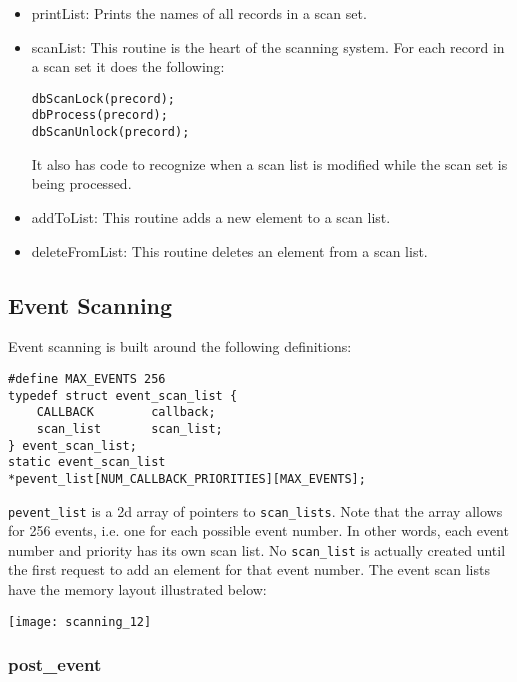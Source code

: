 \begin{itemize}
\item printList: Prints the names of all records in a scan set.

\item scanList: This routine is the heart of the scanning system.
For each record in a scan set it does the following:

\begin{verbatim}
dbScanLock(precord);
dbProcess(precord);
dbScanUnlock(precord);
\end{verbatim}

It also has code to recognize when a scan list is modified while the scan set is being processed.

\item addToList: This routine adds a new element to a scan list.

\item deleteFromList: This routine deletes an element from a scan list.

\end{itemize}

\subsection{Event Scanning}

Event scanning is built around the following definitions:

\begin{verbatim}
#define MAX_EVENTS 256
typedef struct event_scan_list {
    CALLBACK        callback;
    scan_list       scan_list;
} event_scan_list;
static event_scan_list
*pevent_list[NUM_CALLBACK_PRIORITIES][MAX_EVENTS];
\end{verbatim}

\verb|pevent_list| is a 2d array of pointers to \verb|scan_lists|.
Note that the array allows for 256 events, i.e. one for each possible event number.
In other words, each event number and priority has its own scan list.
No \verb|scan_list| is actually created until the first request to add an element for that event number.
The event scan lists have the memory layout illustrated below:

\begin{center}
\texttt{[image: scanning\_12]}
\end{center}

\subsubsection{post\_event} 

